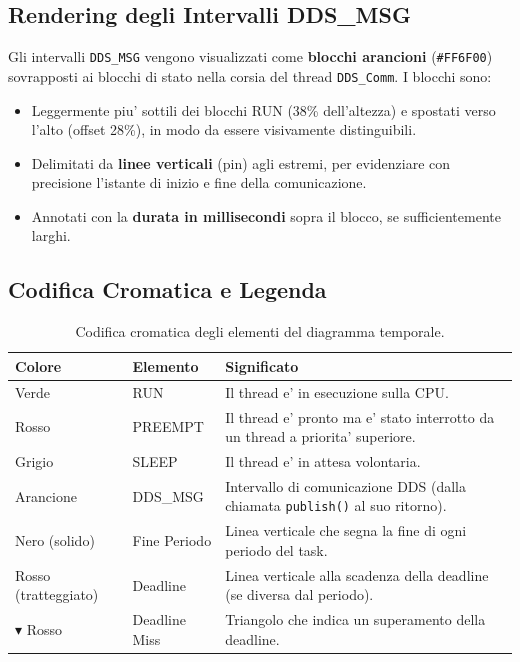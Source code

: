 \subsection{Rendering degli Intervalli DDS\_MSG}
\label{subsec:dds_rendering}

Gli intervalli \texttt{DDS\_MSG} vengono visualizzati come
\textbf{blocchi arancioni} (\texttt{\#FF6F00}) sovrapposti ai blocchi
di stato nella corsia del thread \texttt{DDS\_Comm}. I blocchi sono:

\begin{itemize}
    \item Leggermente piu' sottili dei blocchi RUN (38\% dell'altezza)
          e spostati verso l'alto (offset 28\%), in modo da essere
          visivamente distinguibili.
    \item Delimitati da \textbf{linee verticali} (pin) agli estremi,
          per evidenziare con precisione l'istante di inizio e fine
          della comunicazione.
    \item Annotati con la \textbf{durata in millisecondi} sopra il blocco,
          se sufficientemente larghi.
\end{itemize}

\subsection{Codifica Cromatica e Legenda}
\label{subsec:colori}

\begin{table}[htbp]
\centering
\caption{Codifica cromatica degli elementi del diagramma temporale.}
\label{tab:colori}
\begin{tabular}{llp{6cm}}
\toprule
\textbf{Colore} & \textbf{Elemento} & \textbf{Significato} \\
\midrule
\textcolor[HTML]{43A047}{Verde}  & RUN & Il thread e' in esecuzione sulla CPU. \\
\textcolor[HTML]{E53935}{Rosso}  & PREEMPT & Il thread e' pronto ma e' stato
    interrotto da un thread a priorita' superiore. \\
\textcolor[HTML]{90A4AE}{Grigio} & SLEEP & Il thread e' in attesa volontaria. \\
\textcolor[HTML]{FF6F00}{Arancione} & DDS\_MSG & Intervallo di comunicazione DDS
    (dalla chiamata \texttt{publish()} al suo ritorno). \\
Nero (solido)  & Fine Periodo & Linea verticale che segna la fine
    di ogni periodo del task. \\
Rosso (tratteggiato) & Deadline & Linea verticale alla scadenza della
    deadline (se diversa dal periodo). \\
$\blacktriangledown$ Rosso & Deadline Miss & Triangolo che indica un
    superamento della deadline. \\
\bottomrule
\end{tabular}
\end{table}



